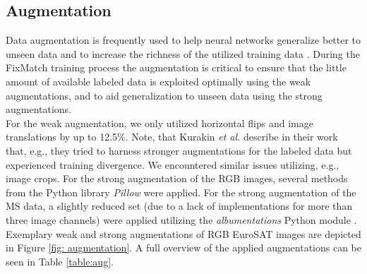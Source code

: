 \documentclass[journal]{IEEEtran}
\newcommand{\etal}{\textit{et al.}}
\begin{document}
\subsection{Augmentation}
Data augmentation is frequently used to help neural networks generalize better to unseen data and to increase the richness of the utilized training data \cite{cubuk2018,cubuk2020}. During the FixMatch training process the augmentation is critical to ensure that the little amount of available labeled data is exploited optimally using the weak augmentations, and to aid generalization to unseen data using the strong augmentations. \\
For the weak augmentation, we only utilized horizontal flips and image translations by up to 12.5\%.
Note, that Kurakin \etal{} \cite{kurakin2020} describe in their work that, e.g., they tried to harness stronger augmentations for the labeled data but experienced training divergence. We encountered similar issues utilizing, e.g., image crops. For the strong augmentation of the RGB images, several methods from the Python library \textit{Pillow} were applied. For the strong augmentation of the MS data, a slightly reduced set (due to a lack of implementations for more than three image channels) were applied utilizing the \textit{albumentations} Python module \cite{buslaev2020}. 
Exemplary weak and strong augmentations of RGB EuroSAT images are depicted in Figure \ref{fig: augmentation}. A full overview of the applied augmentations can be seen in Table \ref{table:aug}.
\end{document}
